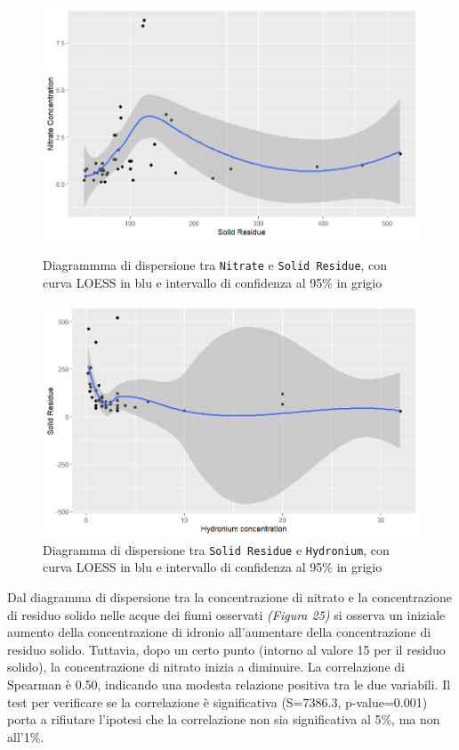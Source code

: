\documentclass{article} %
\begin{document}
\begin{figure}[H]
    \centering
    \begin{minipage}{0.49\textwidth}
        \centering
        \includegraphics[width=\textwidth]{immagini/sr_nitrate.png}
        \captionsetup{justification=centering}
        \caption{Diagrammma di dispersione tra \texttt{Nitrate} e \texttt{Solid Residue}, con curva LOESS in blu e intervallo di confidenza al 95\% in grigio}
    \end{minipage}
    \hfill
    \begin{minipage}{0.49\textwidth}
        \centering
        \includegraphics[width=\textwidth]{immagini/sr_hy.png}
        \captionsetup{justification=centering}
        \caption{Diagramma di dispersione tra \texttt{Solid Residue} e \texttt{Hydronium}, con curva LOESS in blu e intervallo di confidenza al 95\% in grigio}
    \end{minipage}
\end{figure}

Dal diagramma di dispersione tra la concentrazione di nitrato e la concentrazione di residuo solido nelle acque dei fiumi osservati \textit{(Figura 25)} si osserva un iniziale aumento della concentrazione di idronio all'aumentare della concentrazione di residuo solido. Tuttavia, dopo un certo punto (intorno al valore 15 per il residuo solido), la concentrazione di nitrato inizia a diminuire.
La correlazione di Spearman è 0.50, indicando una modesta relazione positiva tra le due variabili. 
Il test per verificare se la correlazione è significativa (S=7386.3, p-value=0.001) porta a rifiutare l'ipotesi che la correlazione non sia significativa al 5\%, ma non all'1\%.
\end{document}
